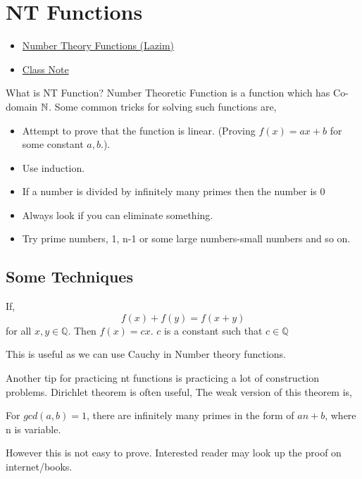 \chapter{NT Functions}%

\begin{linkb}
   \begin{itemize}
        \item \href{https://www.youtube.com/watch?v=BIocWacBJEs}{Number Theory Functions (Lazim)}
        \item \href{https://drive.google.com/file/d/1pedr_KX0Yom8O2hremeRoJO13zhEeEmY/view}{Class Note}
   \end{itemize}
\end{linkb}

What is NT Function? Number Theoretic Function is a function which has Co-domain $\mathbb N$. Some common tricks for solving such functions are,
\begin{itemize}
 \item Attempt to prove that the function is linear. (Proving $f(x) = ax + b $ for some constant $a,b$.). 
 \item Use induction.
 \item If a number is divided by infinitely many primes then the number is $0$
 \item Always look if you can eliminate something. 
 \item Try prime numbers, 1, n-1 or some large numbers-small numbers and so on.
 \end{itemize} 
\section{Some Techniques}
 \begin{theorem}
 If, 
\[ f(x) + f(y) = f(x+y) \]
 for all $x,y\in \mathbb Q $. Then $f(x) = cx$. $c$ is a constant such that $c\in \mathbb Q$
\end{theorem}
This is useful as we can use Cauchy in Number theory functions.
 
 Another tip for practicing nt functions is practicing a lot of construction problems.
 Dirichlet theorem is often useful, The weak version of this theorem is,
 \begin{theorem}
 For $gcd(a,b) = 1$, there are infinitely many primes in the form of $an+b$, where n is variable.
 \end{theorem}
 However this is not easy to prove. Interested reader may look up the proof on internet/books.
